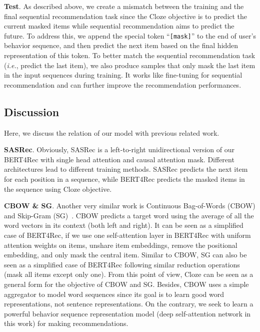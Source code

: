 \textbf{Test}.
As described above, we create a mismatch between the training and the final sequential recommendation task since the Cloze objective is to predict the current masked items while sequential recommendation aims to predict the future.
To address this, we append the special token ``\texttt{[mask]}'' to the end of user's behavior sequence, and then predict the next item based on the final hidden representation of this token.
To better match the sequential recommendation task (\textit{i.e.}, predict the last item), we also produce samples that only mask the last item in the input sequences during training.
It works like fine-tuning for sequential recommendation and can further improve the recommendation performances.

\subsection{Discussion}

Here, we discuss the relation of our model with previous related work.

\textbf{SASRec}. Obviously, SASRec is a left-to-right unidirectional version of our BERT4Rec with single head attention and causal attention mask.
Different architectures lead to different training methods.
SASRec predicts the next item for each position in a sequence, while BERT4Rec predicts the masked items in the sequence using Cloze objective.

\textbf{CBOW \& SG}. Another very similar work is Continuous Bag-of-Words (CBOW) and Skip-Gram (SG)~\cite{Mikolov:cbow}.
CBOW predicts a target word using the average of all the word vectors in its context (both left and right).
It can be seen as a simplified case of BERT4Rec, if we use one self-attention layer in BERT4Rec with uniform attention weights on items, unshare item embeddings, remove the positional embedding, and only mask the central item.
Similar to CBOW, SG can also be seen as a simplified case of BERT4Rec following similar reduction operations (mask all items except only one).
From this point of view, Cloze can be seen as a general form for the objective of CBOW and SG.
Besides, CBOW uses a simple aggregator to model word sequences since its goal is to learn good word representations, not sentence representations.
On the contrary, we seek to learn a powerful behavior sequence representation model (deep self-attention network in this work) for making recommendations.



